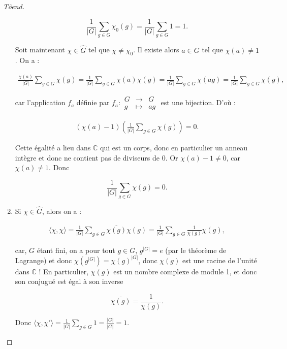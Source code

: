 \documentclass[french]{book}
\theoremstyle{definition}
\begin{document}
\begin{proof}[T\~{o}end]
\begin{enumerate}
    \[\frac{1}{\lvert G \rvert} \sum_{g \in G}^{} \chi_0(g) = \frac{1}{\lvert G \rvert} \sum_{g \in G}^{} 1 = 1.\]

    Soit maintenant \(\chi \in \hat{G}\) tel que \(\chi \neq \chi_0\). Il existe alors \(a \in G\) tel que \(\chi(a) \neq 1\). On a :

    \begin{gather*}
      \frac{\chi(a)}{\lvert G \rvert} \sum_{g \in G}^{} \chi(g) = \frac{1}{\lvert G \rvert} \sum_{g \in G}^{} \chi(a) \chi(g) = \frac{1}{\lvert G \rvert}\sum_{g \in G}^{}  \chi(ag)= \frac{1}{\lvert G \rvert} \sum_{g \in G}^{} \chi(g),
    \end{gather*}

    car l'application \(f_a\) définie par \(f_a : \begin{matrix}
    G & \longrightarrow & G \\
    g & \longmapsto & ag
    \end{matrix}\) est une bijection. D'où :

    \begin{gather*}
      (\chi(a) - 1) \left(\frac{1}{\lvert G \rvert} \sum_{g \in G}^{} \chi(g) \right) = 0.
    \end{gather*}

    Cette égalité a lieu dans \(\mathbb{C}\) qui est un corps, donc en particulier un anneau intègre et donc ne contient pas de diviseurs de 0. Or \(\chi(a) -1 \neq 0\), car \(\chi(a) \neq 1\). Donc

    \[\frac{1}{\lvert G \rvert}\sum_{g \in G}^{} \chi(g) = 0.\]

    \item Si \(\chi \in \hat{G}\), alors on a :

    \begin{gather*}
      \langle \chi, \chi \rangle  = \frac{1}{\lvert G \rvert} \sum_{g \in G} \overline{\chi(g)} \chi(g) = \frac{1}{\lvert G \rvert} \sum_{g \in G} \frac{1}{\chi(g)} \chi(g),
    \end{gather*}

    car, \(G\) étant fini, on a pour tout \(g \in G\), \(g ^{\lvert G \rvert} = e\) (par le théorème de Lagrange) et donc \(\chi(g ^{\lvert G \rvert})= \chi(g) ^{\lvert G \rvert}\), donc \(\chi(g)\) est une racine de l'unité dans \(\mathbb{C}\) ! En particulier, \(\chi(g)\) est un nombre complexe de module 1, et donc son conjugué est égal à son inverse

    \[\overline{\chi(g)} = \frac{1}{\chi(g)}.\]

    Donc \(\langle \chi, \chi' \rangle = \frac{1}{\lvert G \rvert} \sum_{g \in G} 1 = \frac{\lvert G \rvert}{\lvert G \rvert}=1. \)


\end{enumerate}
\end{proof}
\end{document}
